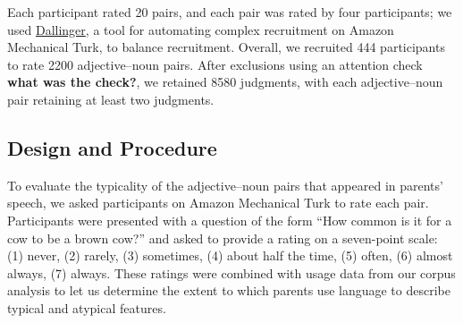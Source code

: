 \documentclass[10pt, letterpaper]{article}
\begin{document}
Each participant rated 20 pairs, and each pair was rated by four
participants; we used
\href{http://docs.dallinger.io/en/latest/}{Dallinger}, a tool for
automating complex recruitment on Amazon Mechanical Turk, to balance
recruitment. Overall, we recruited 444 participants to rate 2200
adjective--noun pairs. After exclusions using an attention check
\textbf{what was the check?}, we retained 8580 judgments, with each
adjective--noun pair retaining at least two judgments.

\hypertarget{design-and-procedure}{%
\subsection{Design and Procedure}\label{design-and-procedure}}

To evaluate the typicality of the adjective--noun pairs that appeared in
parents' speech, we asked participants on Amazon Mechanical Turk to rate
each pair. Participants were presented with a question of the form ``How
common is it for a cow to be a brown cow?'' and asked to provide a
rating on a seven-point scale: (1) never, (2) rarely, (3) sometimes, (4)
about half the time, (5) often, (6) almost always, (7) always. These
ratings were combined with usage data from our corpus analysis to let us
determine the extent to which parents use language to describe typical
and atypical features.
\end{document}
